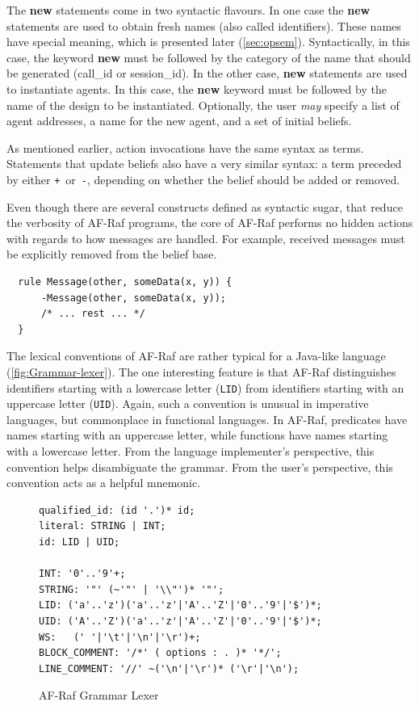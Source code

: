\documentclass[a4paper,12pt,oneside,fleqn]{book} %
\begin{document}
The {\bf new} statements come in two syntactic flavours. In one case the
{\bf new} statements are used to obtain fresh names (also called
identifiers). These names have special meaning, which is presented later
(\autoref{sec:opsem}). Syntactically, in this case, the keyword {\bf new}
must be followed by the category of the name that should be generated
(call\_id or session\_id). In the other case, {\bf new} statements are used
to instantiate agents. In this case, the {\bf new} keyword must be followed
by the name of the design to be instantiated.  Optionally, the user
\emph{may} specify a list of agent addresses, a name for the new agent, and
a set of initial beliefs.

As mentioned earlier, action invocations have the same syntax as terms.
Statements that update beliefs also have a very similar syntax: a term
preceded by either \verb-+-~or~\verb+-+, depending on whether the belief
should be added or removed.

\begin{example}
Even though there are several constructs defined as syntactic sugar, that
reduce the verbosity of AF-Raf programs, the core of AF-Raf performs no
hidden actions with regards to how messages are handled. For example,
received messages must be explicitly removed from the belief base.

\begin{verbatim}
  rule Message(other, someData(x, y)) {
      -Message(other, someData(x, y));
      /* ... rest ... */
  }
\end{verbatim}
\end{example}

The lexical conventions of AF-Raf are rather typical for a Java-like
language (\autoref{fig:Grammar-lexer}). The one interesting feature is that
AF-Raf distinguishes identifiers starting with a lowercase letter
(\verb+LID+) from identifiers starting with an uppercase letter
(\verb+UID+). Again, such a convention is unusual in imperative languages,
but commonplace in functional languages. In AF-Raf, predicates have names
starting with an uppercase letter, while functions have names starting with
a lowercase letter. From the language implementer's perspective, this
convention helps disambiguate the grammar. From the user's perspective,
this convention acts as a helpful mnemonic.

\begin{figure}\footnotesize %
\begin{verbatim}
qualified_id: (id '.')* id;
literal: STRING | INT;
id: LID | UID;

INT: '0'..'9'+;
STRING: '"' (~'"' | '\\"')* '"';
LID: ('a'..'z')('a'..'z'|'A'..'Z'|'0'..'9'|'$')*;
UID: ('A'..'Z')('a'..'z'|'A'..'Z'|'0'..'9'|'$')*;
WS:   (' '|'\t'|'\n'|'\r')+;
BLOCK_COMMENT: '/*' ( options : . )* '*/';
LINE_COMMENT: '//' ~('\n'|'\r')* ('\r'|'\n');
\end{verbatim}
\caption{AF-Raf Grammar Lexer}
\label{fig:Grammar-lexer}
\end{figure} %
\end{document}
